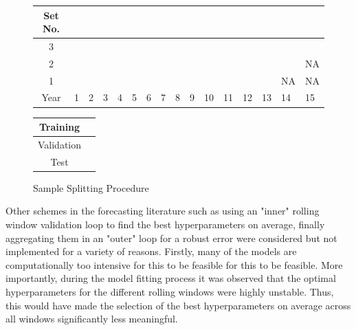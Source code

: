 \documentclass[11pt, a4paper, table]{article}
\begin{document}
\begin{figure}
	\begin{center}
		\begin{tabular}{|c|p{0.40cm}p{0.40cm}p{0.40cm}p{0.40cm}p{0.40cm}p{0.40cm}p{0.40cm}p{0.40cm}p{0.40cm}p{0.40cm}p{0.40cm}p{0.40cm}p{0.40cm}p{0.40cm}p{0.40cm}|}
			\hline
			Set No. &&&&&&&&&&&&&&& \\
			\hline
			3 & \cellcolor{cyan} & \cellcolor{cyan} & \cellcolor{cyan} & \cellcolor{cyan} & \cellcolor{cyan} & \cellcolor{cyan} & \cellcolor{cyan} & \cellcolor{cyan} & \cellcolor{cyan} &
			\cellcolor{pink} & \cellcolor{pink} & \cellcolor{pink} & \cellcolor{pink} & \cellcolor{pink} & 	
			\cellcolor{olive} \\
			2 & \cellcolor{cyan} & \cellcolor{cyan} & \cellcolor{cyan} & \cellcolor{cyan} & \cellcolor{cyan} & \cellcolor{cyan} & \cellcolor{cyan} & \cellcolor{cyan} &
			\cellcolor{pink} & \cellcolor{pink} & \cellcolor{pink} & \cellcolor{pink} & \cellcolor{pink} & 	
			\cellcolor{olive} & NA  \\
			1 & \cellcolor{cyan} & \cellcolor{cyan} & \cellcolor{cyan} & \cellcolor{cyan} & \cellcolor{cyan} & \cellcolor{cyan} & \cellcolor{cyan} &
			\cellcolor{pink} & \cellcolor{pink} & \cellcolor{pink} & \cellcolor{pink} & \cellcolor{pink} & 	
			\cellcolor{olive} & NA & NA \\
			\hline
			Year & 1 & 2 & 3 & 4 & 5 & 6 & 7 & 8 & 9 & 10 & 11 & 12 & 13 & 14 & 15\\
			\hline
		\end{tabular}
		\medskip
		\begin{tabular}{|c|p{0.40cm}|}
			\hline
			Training & \cellcolor{cyan} \\
			\hline
			Validation & \cellcolor{pink} \\
			\hline
			Test & \cellcolor{olive} \\
			\hline
		\end{tabular}
	\end{center}
	\caption{Sample Splitting Procedure}
	\label{sample_split_diag}
\end{figure}

Other schemes in the forecasting literature such as using an "inner" rolling window validation loop to find the best hyperparameters on average, finally aggregating them in an "outer" loop for a robust error were considered but not implemented for a variety of reasons. Firstly, many of the models are computationally too intensive for this to be feasible for this to be feasible. More importantly, during the model fitting process it was observed that the optimal hyperparameters for the different rolling windows were highly unstable. Thus, this would have made the selection of the best hyperparameters on average across all windows significantly less meaningful.
\end{document}
